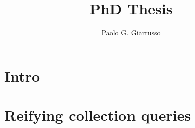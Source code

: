 \documentclass{book}
\title{PhD Thesis}
\author{Paolo G. Giarrusso}
\begin{document}
\maketitle
\chapter{Intro}
\chapter{Reifying collection queries}






\end{document}
